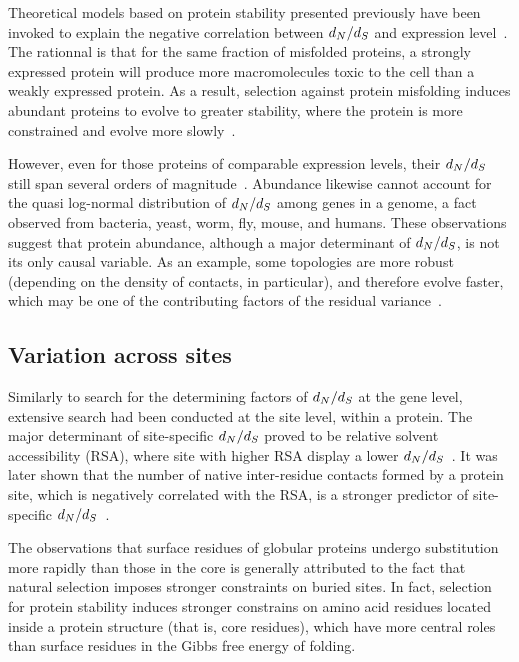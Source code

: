 Theoretical models based on protein stability presented previously have been invoked to explain the negative correlation between $d_N / d_S$ and expression level~\citep{Wilke2006, Drummond2008}.
The rationnal is that for the same fraction of misfolded proteins, a strongly expressed protein will produce more macromolecules toxic to the cell than a weakly expressed protein.
As a result, selection against protein misfolding induces abundant proteins to evolve to greater stability, where the protein is more constrained and evolve more slowly~\citep{Serohijos2012}.

However, even for those proteins of comparable expression levels, their $d_N / d_S$ still span several orders of magnitude~\citep{Drummond2008}.
Abundance likewise cannot account for the quasi log-normal distribution of $d_N / d_S$ among genes in a genome, a fact observed from bacteria, yeast, worm, fly, mouse, and humans.
These observations suggest that protein abundance, although a major determinant of $d_N / d_S$, is not its only causal variable.
As an example, some topologies are more robust (depending on the density of contacts, in particular), and therefore evolve faster, which may be one of the contributing factors of the residual variance~\citep{Echave2017}.

\subsection{Variation across sites}
\label{subsec:thermo-variation-across-sites}

Similarly to search for the determining factors of $d_N / d_S$ at the gene level, extensive search had been conducted at the site level, within a protein.
The major determinant of site-specific $d_N / d_S$ proved to be relative solvent accessibility (RSA), where site with higher RSA display a lower $d_N / d_S$~\citep{Ramsey2011}.
It was later shown that the number of native inter-residue contacts formed by a protein site, which is negatively correlated with the RSA, is a stronger predictor of site-specific $d_N / d_S$~\citep{Yeh2013}.

The observations that surface residues of globular proteins undergo \gls{substitution} more rapidly than those in the core is generally attributed to the fact that natural selection imposes stronger constraints on buried sites.
In fact, selection for protein stability induces stronger constrains on amino acid residues located inside a protein structure (that is, core residues), which have more central roles than surface residues in the Gibbs free energy of folding.

